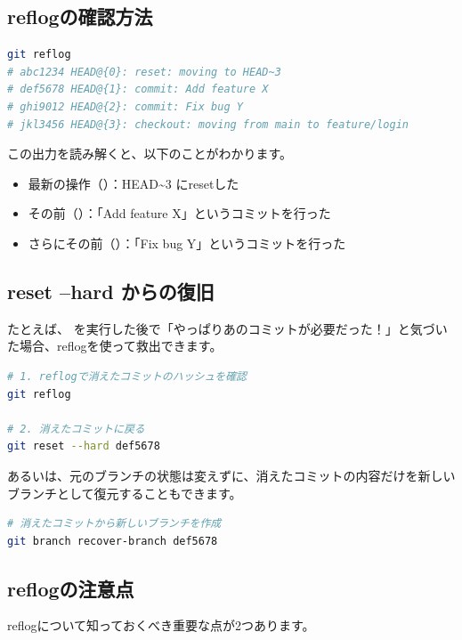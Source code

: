 \subsection{reflogの確認方法}

\begin{lstlisting}[language=bash]
git reflog
# abc1234 HEAD@{0}: reset: moving to HEAD~3
# def5678 HEAD@{1}: commit: Add feature X
# ghi9012 HEAD@{2}: commit: Fix bug Y
# jkl3456 HEAD@{3}: checkout: moving from main to feature/login
\end{lstlisting}

この出力を読み解くと、以下のことがわかります。

\begin{itemize}
  \item 最新の操作（）：HEAD\textasciitilde 3 にresetした
  \item その前（）：「Add feature X」というコミットを行った
  \item さらにその前（）：「Fix bug Y」というコミットを行った
\end{itemize}

\subsection{reset --hard からの復旧}

たとえば、 を実行した後で「やっぱりあのコミットが必要だった！」と気づいた場合、reflogを使って救出できます。

\begin{lstlisting}[language=bash]
# 1. reflogで消えたコミットのハッシュを確認
git reflog

# 2. 消えたコミットに戻る
git reset --hard def5678
\end{lstlisting}

あるいは、元のブランチの状態は変えずに、消えたコミットの内容だけを新しいブランチとして復元することもできます。

\begin{lstlisting}[language=bash]
# 消えたコミットから新しいブランチを作成
git branch recover-branch def5678
\end{lstlisting}

\subsection{reflogの注意点}

reflogについて知っておくべき重要な点が2つあります。

